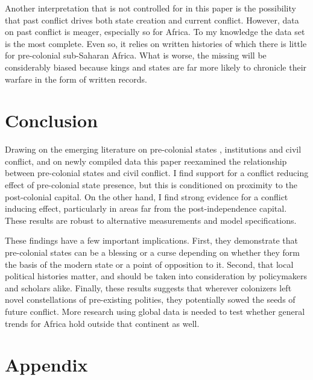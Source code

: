 \documentclass[12pt]{article}
\begin{document}
Another interpretation that is not controlled for in this paper is the
possibility that past conflict drives both state creation and current conflict.
However, data on past conflict is meager, especially so for Africa. To my
knowledge the \citet{Brecke1999} data set is the most complete. Even so, it
relies on written histories of which there is little for pre-colonial
sub-Saharan Africa. What is worse, the missing will be considerably biased
because kings and states are far more likely to chronicle their warfare in the
form of written records.

\section{Conclusion}

Drawing on the emerging literature on pre-colonial states \citep{Paine2019,
Depetris-Chauvin2016}, institutions \citep{Wig2016, Englebert2002,
Michalopoulos2018} and civil conflict, and on newly compiled data this paper
reexamined the relationship between pre-colonial states and civil conflict. I
find support for a conflict reducing effect of pre-colonial state presence, but
this is conditioned on proximity to the post-colonial capital. On the other
hand, I find strong evidence for a conflict inducing effect, particularly in
areas far from the post-independence capital. These results are robust to
alternative measurements and model specifications.

These findings have a few important implications. First, they demonstrate that
pre-colonial states can be a blessing or a curse depending on whether they form
the basis of the modern state or a point of opposition to it. Second, that local
political histories matter, and should be taken into consideration by
policymakers and scholars alike. Finally, these results suggests that wherever
colonizers left novel constellations of pre-existing polities, they potentially
sowed the seeds of future conflict. More research using global data is needed to
test whether general trends for Africa hold outside that continent as well.


\pagebreak




\pagebreak
\section*{Appendix}
\end{document}
